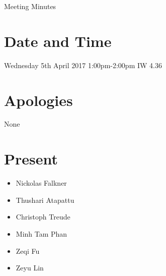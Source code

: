 \documentclass[11pt, a4paper]{article}
\begin{document}
\vspace*{15pt}

\begin{center}
\huge Meeting Minutes




\end{center}

\section{Date and Time}
 Wednesday 5th April 2017 1:00pm-2:00pm IW 4.36

\section{Apologies}
None

\section{Present}
\begin{itemize}
	\item Nickolas Falkner
	\item Thushari Atapattu 
	\item Christoph Treude 
	\item Minh Tam Phan
	\item Zeqi Fu
	\item Zeyu Lin
\end{itemize}
\end{document}
